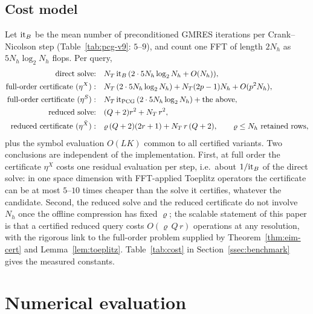 \documentclass[11pt]{amsart}
\theoremstyle{remark}
\begin{document}
\subsection{Cost model}
\label{ssec:cost}
Let ${\rm it}_B$ be the mean number of preconditioned GMRES iterations per Crank--Nicolson step
(Table~\ref{tab:pcg-v9}: $5$--$9$), and count one FFT of length $2N_h$ as $5N_h\log_2N_h$
flops.  Per query,
\begin{align*}
 \text{direct solve:}&\quad N_T\,{\rm it}_B\,(2\cdot5N_h\log_2N_h+O(N_h)),\\
 \text{full-order certificate }(\eta^X):&\quad N_T\,(2\cdot5N_h\log_2N_h)+N_T(2p-1)N_h+O(p^2N_h),\\
 \text{full-order certificate }(\eta^S):&\quad N_T\,{\rm it}_{\rm PCG}\,(2\cdot5N_h\log_2N_h)+\text{the above},\\
 \text{reduced solve:}&\quad (Q+2)r^2+N_T\,r^2,\\
 \text{reduced certificate }(\eta^{\bar X}):&\quad \varrho\,(Q+2)(2r+1)+N_T\,r\,(Q+2),\qquad \varrho\le N_h\ \text{retained rows},
\end{align*}
plus the symbol evaluation $O(LK)$ common to all certified variants.  Two conclusions are
independent of the implementation.  First, at full order the certificate $\eta^X$ costs one
residual evaluation per step, i.e.\ about $1/{\rm it}_B$ of the direct solve: in one space
dimension with FFT-applied Toeplitz operators the certificate can be at most $5$--$10$ times
cheaper than the solve it certifies, whatever the candidate.  Second, the reduced solve and the
reduced certificate do not involve $N_h$ once the offline compression has fixed $\varrho$; the
scalable statement of this paper is that a certified reduced query costs $O(\varrho\,Q\,r)$
operations at any resolution, with the rigorous link to the full-order problem supplied by
Theorem~\ref{thm:eim-cert} and Lemma~\ref{lem:toeplitz}.
Table~\ref{tab:cost} in Section~\ref{ssec:benchmark} gives the measured constants.

\section{Numerical evaluation}
\label{sec:numerics}
\end{document}

